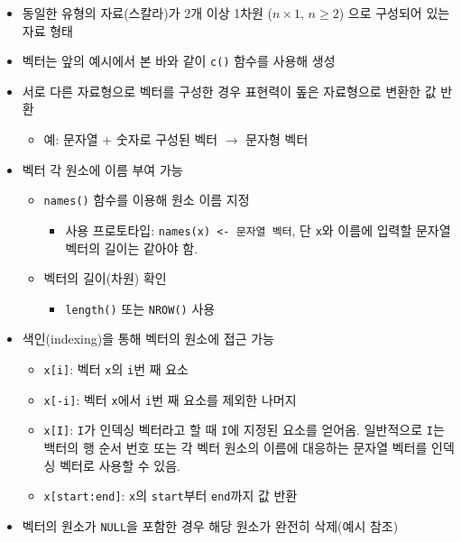 \documentclass[11pt,a4paper]{book}
\providecommand{\tightlist}{%
  \setlength{\itemsep}{0pt}\setlength{\parskip}{0pt}}
\theoremstyle{definition}
\theoremstyle{definition}
\theoremstyle{definition}
\theoremstyle{remark}
\begin{document}
\begin{itemize}
\tightlist
\item
  동일한 유형의 자료(스칼라)가 2개 이상 1차원 (\(n \times 1\),
  \(n \geq 2\)) 으로 구성되어 있는 자료 형태
\item
  벡터는 앞의 예시에서 본 바와 같이 \texttt{c()} 함수를 사용해 생성
\item
  서로 다른 자료형으로 벡터를 구성한 경우 표현력이 돞은 자료형으로
  변환한 값 반환

  \begin{itemize}
  \tightlist
  \item
    예: 문자열 + 숫자로 구성된 벡터 \(\rightarrow\) 문자형 벡터
  \end{itemize}
\item
  벡터 각 원소에 이름 부여 가능

  \begin{itemize}
  \tightlist
  \item
    \texttt{names()} 함수를 이용해 원소 이름 지정

    \begin{itemize}
    \tightlist
    \item
      사용 프로토타입: \texttt{names(x)\ \textless{}-\ 문자열\ 벡터}, 단
      \texttt{x}와 이름에 입력할 문자열 벡터의 길이는 같아야 함.
    \end{itemize}
  \item
    벡터의 길이(차원) 확인

    \begin{itemize}
    \tightlist
    \item
      \texttt{length()} 또는 \texttt{NROW()} 사용
    \end{itemize}
  \end{itemize}
\item
  색인(indexing)을 통해 벡터의 원소에 접근 가능

  \begin{itemize}
  \tightlist
  \item
    \texttt{x{[}i{]}}: 벡터 \texttt{x}의 \texttt{i}번 째 요소
  \item
    \texttt{x{[}-i{]}}: 벡터 \texttt{x}에서 \texttt{i}번 째 요소를
    제외한 나머지
  \item
    \texttt{x{[}I{]}}: \texttt{I}가 인덱싱 벡터라고 할 때 \texttt{I}에
    지정된 요소를 얻어옴. 일반적으로 \texttt{I}는 백터의 행 순서 번호
    또는 각 벡터 원소의 이름에 대응하는 문자열 벡터를 인덱싱 벡터로
    사용할 수 있음.
  \item
    \texttt{x{[}start:end{]}}: \texttt{x}의 \texttt{start}부터
    \texttt{end}까지 값 반환
  \end{itemize}
\item
  벡터의 원소가 \texttt{NULL}을 포함한 경우 해당 원소가 완전히 삭제(예시
  참조)
\end{itemize}
\end{document}
